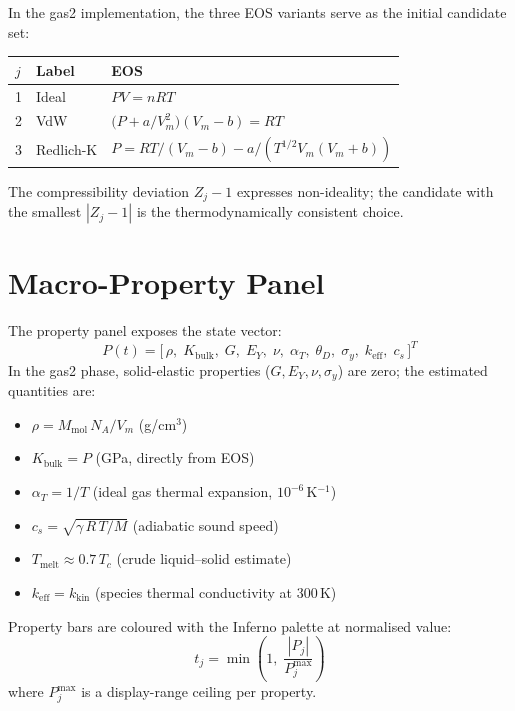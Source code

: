 ﻿\documentclass[11pt]{article}
\begin{document}
In the gas2 implementation, the three EOS variants serve as the initial
candidate set:
\begin{center}
\begin{tabular}{lll}
\toprule
$j$ & Label & EOS \\
\midrule
1 & Ideal      & $PV = nRT$ \\
2 & VdW        & $\bigl(P + a/V_m^2\bigr)(V_m - b) = RT$ \\
3 & Redlich-K  & $P = RT/(V_m-b) - a/(T^{1/2}V_m(V_m+b))$ \\
\bottomrule
\end{tabular}
\end{center}
The compressibility deviation $Z_j - 1$ expresses non-ideality; the
candidate with the smallest $|Z_j - 1|$ is the thermodynamically
consistent choice.

\section{Macro-Property Panel}
\label{sec:props}

The property panel exposes the state vector:
\begin{equation}
  P(t) = \bigl[\,
    \rho,\;K_\mathrm{bulk},\;G,\;E_Y,\;\nu,\;
    \alpha_T,\;\theta_D,\;\sigma_y,\;k_\mathrm{eff},\;c_s
  \,\bigr]^T
\end{equation}
In the gas2 phase, solid-elastic properties ($G, E_Y, \nu, \sigma_y$) are
zero; the estimated quantities are:

\begin{itemize}[noitemsep]
  \item $\rho = M_\mathrm{mol}\,N_A / V_m$ (g/cm$^3$)
  \item $K_\mathrm{bulk} = P$ (GPa, directly from EOS)
  \item $\alpha_T = 1/T$ (ideal gas thermal expansion, $10^{-6}$\,K$^{-1}$)
  \item $c_s = \sqrt{\gamma\,R\,T/M}$ (adiabatic sound speed)
  \item $T_\mathrm{melt} \approx 0.7\,T_c$ (crude liquid--solid estimate)
  \item $k_\mathrm{eff} = k_\mathrm{kin}$ (species thermal conductivity at 300\,K)
\end{itemize}

Property bars are coloured with the Inferno palette at normalised value:
\begin{equation}
  t_j = \min\!\left(1,\;\frac{|P_j|}{P_j^\mathrm{max}}\right)
\end{equation}
where $P_j^\mathrm{max}$ is a display-range ceiling per property.
\end{document}
